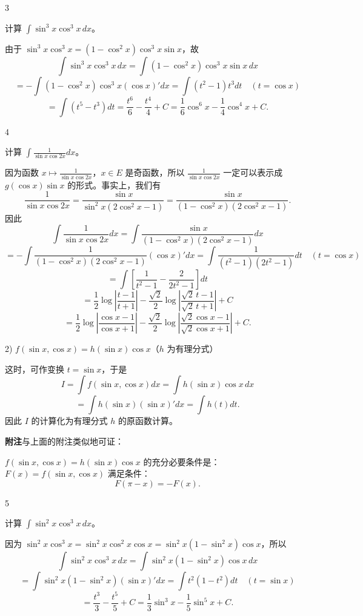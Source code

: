 \begin{sourceexample}{3}

	计算 \(\displaystyle\int\sin^3x\cos^3x\,dx\)。

	由于 \(\sin^3x\cos^3x=(1-\cos^2x)\cos^3x\sin x\)，故
	\[
	\int\sin^3x\cos^3x\,dx=\int(1-\cos^2x)\cos^3x\sin x\,dx
	\]
	\[
	=-\int(1-\cos^2x)\cos^3x(\cos x)'dx=\int(t^2-1)t^3dt\quad(t=\cos x)
	\]
	\[
	=\int(t^5-t^3)dt=\frac{t^6}{6}-\frac{t^4}{4}+C=\frac16\cos^6x-\frac14\cos^4x+C.
	\]

\end{sourceexample}

\begin{sourceexample}{4}

	计算 \(\displaystyle\int\frac1{\sin x\cos2x}dx\)。

	因为函数 \(\displaystyle x\longmapsto\frac1{\sin x\cos2x}\)，\(x\in E\) 是奇函数，所以 \(\displaystyle\frac1{\sin x\cos2x}\) 一定可以表示成 \(g(\cos x)\sin x\) 的形式。事实上，我们有
	\[
	\frac1{\sin x\cos2x}=\frac{\sin x}{\sin^2x(2\cos^2x-1)}=\frac{\sin x}{(1-\cos^2x)(2\cos^2x-1)}.
	\]
	因此
	\[
	\int\frac1{\sin x\cos2x}dx=\int\frac{\sin x}{(1-\cos^2x)(2\cos^2x-1)}dx
	\]
	\[
	=-\int\frac1{(1-\cos^2x)(2\cos^2x-1)}(\cos x)'dx=\int\frac1{(t^2-1)(2t^2-1)}dt\quad(t=\cos x)
	\]
	\[
	=\int\left[\frac1{t^2-1}-\frac2{2t^2-1}\right]dt
	\]
	\[
	=\frac12\log\left|\frac{t-1}{t+1}\right|-\frac{\sqrt2}{2}\log\left|\frac{\sqrt2\,t-1}{\sqrt2\,t+1}\right|+C
	\]
	\[
	=\frac12\log\left|\frac{\cos x-1}{\cos x+1}\right|-\frac{\sqrt2}{2}\log\left|\frac{\sqrt2\cos x-1}{\sqrt2\cos x+1}\right|+C.
	\]

\end{sourceexample}

2) \(f(\sin x,\cos x)=h(\sin x)\cos x\)（\(h\) 为有理分式）

这时，可作变换 \(t=\sin x\)，于是
\[
I=\int f(\sin x,\cos x)dx=\int h(\sin x)\cos x\,dx
\]
\[
=\int h(\sin x)(\sin x)'dx=\int h(t)dt.
\]
因此 \(I\) 的计算化为有理分式 \(h\) 的原函数计算。

\textbf{附注}\quad 与上面的附注类似地可证：

\(f(\sin x,\cos x)=h(\sin x)\cos x\) 的充分必要条件是：\(F(x)=f(\sin x,\cos x)\) 满足条件：
\[
F(\pi-x)=-F(x).
\]

\begin{sourceexample}{5}

	计算 \(\displaystyle\int\sin^2x\cos^3x\,dx\)。

	因为 \(\sin^2x\cos^3x=\sin^2x\cos^2x\cos x=\sin^2x(1-\sin^2x)\cos x\)，所以
	\[
	\int\sin^2x\cos^3x\,dx=\int\sin^2x(1-\sin^2x)\cos x\,dx
	\]
	\[
	=\int\sin^2x(1-\sin^2x)(\sin x)'dx=\int t^2(1-t^2)dt\quad(t=\sin x)
	\]
	\[
	=\frac{t^3}{3}-\frac{t^5}{5}+C=\frac13\sin^3x-\frac15\sin^5x+C.
	\]

\end{sourceexample}

